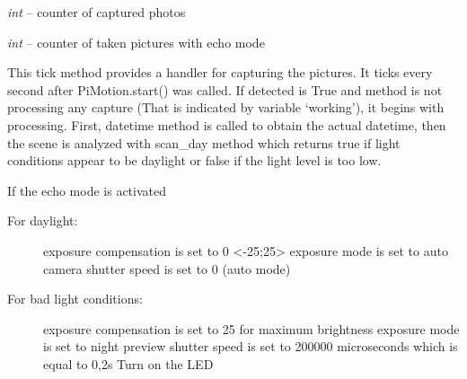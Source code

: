 \documentclass[letterpaper,10pt,english,openany]{sphinxmanual}
\begin{document}
\begin{fulllineitems}

\begin{fulllineitems}
\label{index:rpicameramon.motion.CaptureHandler.i}
\emph{int} -- counter of captured photos

\end{fulllineitems}


\begin{fulllineitems}
\label{index:rpicameramon.motion.CaptureHandler.echoCounter}
\emph{int} -- counter of taken pictures with echo mode

\end{fulllineitems}


\begin{fulllineitems}
\label{index:rpicameramon.motion.CaptureHandler.motion_detected}
\end{fulllineitems}


\begin{fulllineitems}
\label{index:rpicameramon.motion.CaptureHandler.tick}
This tick method provides a handler for capturing the pictures.
It ticks every second after PiMotion.start() was called.
If detected is True and method is not processing any capture
(That is indicated by variable `working'), it begins with processing.
First, datetime method is called to obtain the actual datetime, then
the scene is analyzed with scan\_day method which returns true if
light conditions appear to be daylight or false if the light level
is too low.

If the echo mode is activated
\begin{description}
\item[{For daylight:}] \leavevmode
exposure compensation is set to 0 \textless{}-25;25\textgreater{}
exposure mode is set to auto
camera shutter speed is set to 0 (auto mode)

\item[{For bad light conditions:}] \leavevmode
exposure compensation is set to 25 for maximum brightness
exposure mode is set to night preview
shutter speed is set to 200000 microseconds which is equal
to 0,2s
Turn on the LED


\end{description}
\end{fulllineitems}
\end{fulllineitems}
\end{document}
